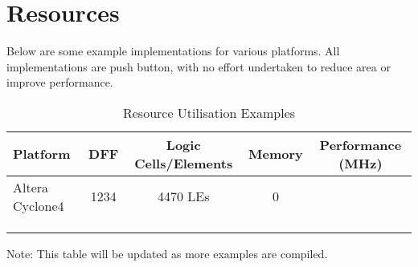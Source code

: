 \chapter{Resources}

Below are some example implementations for various platforms. All implementations are push button, with no effort undertaken to reduce area or improve performance. 
\setlength\LTleft{0pt}
\setlength\LTright{0pt}

\begin{longtable}[]{@{\extracolsep{\fill}}lcccc@{}}
	\toprule
		\textbf{Platform} & \textbf{DFF} & \textbf{Logic Cells/Elements} &
		\textbf{Memory} & \textbf{Performance (MHz)}\tabularnewline
	\midrule
	\endhead
		Altera Cyclone4 & 1234 & 4470 LEs & 0 & \tabularnewline
		& & & &\tabularnewline
		& & & &\tabularnewline
	\bottomrule
	\caption{Resource Utilisation Examples}
	\label{tab:RESOURCES}
\end{longtable}

Note: This table will be updated as more examples are compiled.
